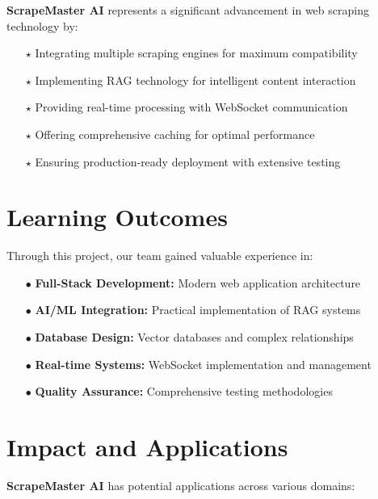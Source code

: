 \documentclass[12pt,a4paper]{report}
\begin{document}
\textbf{ScrapeMaster AI} represents a significant advancement in web scraping technology by:

\begin{itemize}[leftmargin=2cm]
    \item[\textcolor{primaryblue}{$\star$}] Integrating multiple scraping engines for maximum compatibility
    \item[\textcolor{primaryblue}{$\star$}] Implementing RAG technology for intelligent content interaction
    \item[\textcolor{primaryblue}{$\star$}] Providing real-time processing with WebSocket communication
    \item[\textcolor{primaryblue}{$\star$}] Offering comprehensive caching for optimal performance
    \item[\textcolor{primaryblue}{$\star$}] Ensuring production-ready deployment with extensive testing
\end{itemize}

\section{Learning Outcomes}

Through this project, our team gained valuable experience in:

\begin{itemize}[leftmargin=2cm]
    \item[\textcolor{secondarygreen}{$\bullet$}] \textbf{Full-Stack Development:} Modern web application architecture
    \item[\textcolor{secondarygreen}{$\bullet$}] \textbf{AI/ML Integration:} Practical implementation of RAG systems
    \item[\textcolor{secondarygreen}{$\bullet$}] \textbf{Database Design:} Vector databases and complex relationships
    \item[\textcolor{secondarygreen}{$\bullet$}] \textbf{Real-time Systems:} WebSocket implementation and management
    \item[\textcolor{secondarygreen}{$\bullet$}] \textbf{Quality Assurance:} Comprehensive testing methodologies
\end{itemize}

\section{Impact and Applications}

\textbf{ScrapeMaster AI} has potential applications across various domains:
\end{document}
